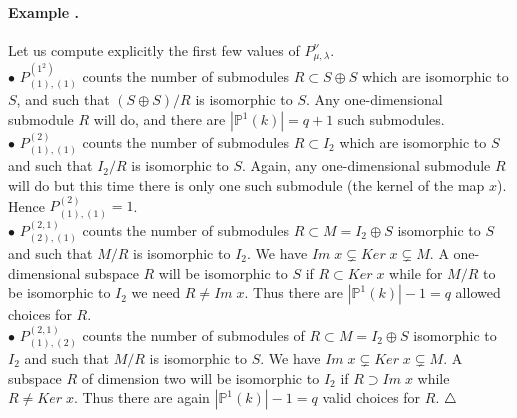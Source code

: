 \documentclass[a4paper,10pt]{amsart}
\def\endexample{$\hfill \triangle$}
\numberwithin{equation}{section}
\begin{document}
\vspace{.2in}

\addtocounter{theo}{1}
\paragraph{\textbf{Example \thetheo.}} Let us compute explicitly the first few values of $P^{\nu}_{\mu,\lambda}$.\\
$\bullet$ $P_{(1),(1)}^{(1^2)}$ counts the number of submodules $R \subset S \oplus S$ which are isomorphic to $S$, and such that $(S \oplus S) /R $ is isomorphic to $S$. Any one-dimensional submodule $R$ will do, and there are $| \mathbb{P}^1(k)|=q+1$ such submodules.\\
$\bullet$ $P^{(2)}_{(1),(1)}$ counts the number of submodules $R \subset I_2$ which are isomorphic to $S$ and such that $I_2/R$ is isomorphic to $S$. Again, any one-dimensional submodule $R$ will do but this time there is only one such submodule (the kernel of the map $x$). Hence
$P^{(2)}_{(1),(1)}=1$.\\
$\bullet$ $P^{(2,1)}_{(2),(1)}$ counts the number of submodules $R \subset M =I_2 \oplus S$ isomorphic to $S$ and such that $M /R$ is isomorphic to $I_2$. We have ${Im}\;x \subsetneq {Ker}\;x \subsetneq M$. A one-dimensional subspace $R$ will be isomorphic to $S$ if $R \subset {Ker}\;x$ while for $M/R$ to be isomorphic to $I_2$ we need $R \neq {Im}\;x$. Thus there are $|\mathbb{P}^1 (k)| -1 =q$ allowed choices for $R$.\\
$\bullet$ $P^{(2,1)}_{(1),(2)}$ counts the number of submodules of $R \subset M =I_2 \oplus S$ isomorphic to $I_2$ and such that $M /R$ is isomorphic to $S$. We have ${Im}\;x \subsetneq {Ker}\;x \subsetneq M$. A subspace $R$ of dimension two will be isomorphic to $I_2$ if $R \supset {Im}\;x$ while  $R \neq {Ker}\;x$. Thus there are again $|\mathbb{P}^1 (k)| -1 =q$ valid choices for $R$.
\endexample

\vspace{.15in}

\addtocounter{theo}{1}
\end{document}
